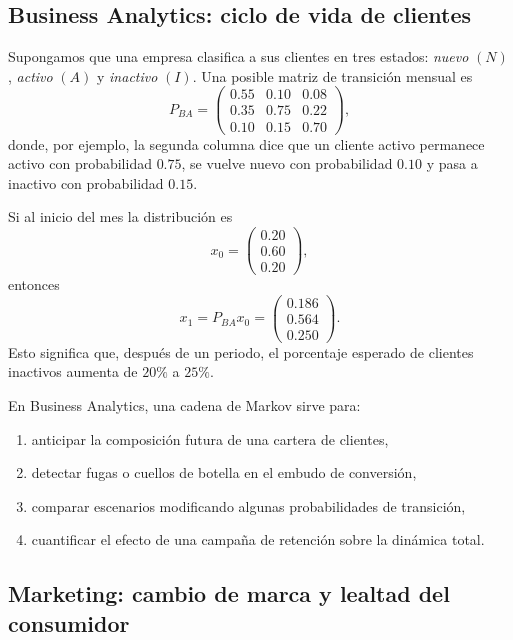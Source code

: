 \documentclass[10pt,a4paper,oneside]{article}
\theoremstyle{plain}
\theoremstyle{definition}
\theoremstyle{remark}
\begin{document}
\subsection{Business Analytics: ciclo de vida de clientes}

Supongamos que una empresa clasifica a sus clientes en tres estados: \emph{nuevo} \((N)\), \emph{activo} \((A)\) y \emph{inactivo} \((I)\). Una posible matriz de transición mensual es
\[
P_{BA}=
\begin{pmatrix}
0.55 & 0.10 & 0.08\\
0.35 & 0.75 & 0.22\\
0.10 & 0.15 & 0.70
\end{pmatrix},
\]
donde, por ejemplo, la segunda columna dice que un cliente activo permanece activo con probabilidad \(0.75\), se vuelve nuevo con probabilidad \(0.10\) y pasa a inactivo con probabilidad \(0.15\).

Si al inicio del mes la distribución es
\[
x_0=
\begin{pmatrix}
0.20\\0.60\\0.20
\end{pmatrix},
\]
entonces
\[
x_1=P_{BA}x_0=
\begin{pmatrix}
0.186\\0.564\\0.250
\end{pmatrix}.
\]
Esto significa que, después de un periodo, el porcentaje esperado de clientes inactivos aumenta de \(20\%\) a \(25\%\).

\begin{methodBox}
En Business Analytics, una cadena de Markov sirve para:
\begin{enumerate}[label=\textup{(\arabic*)}]
\item anticipar la composición futura de una cartera de clientes,
\item detectar fugas o cuellos de botella en el embudo de conversión,
\item comparar escenarios modificando algunas probabilidades de transición,
\item cuantificar el efecto de una campaña de retención sobre la dinámica total.
\end{enumerate}
\end{methodBox}

\subsection{Marketing: cambio de marca y lealtad del consumidor}
\end{document}
